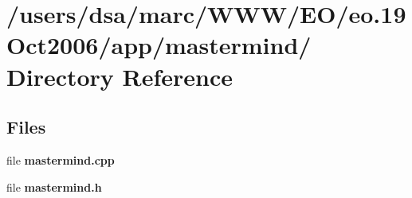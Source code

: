\section{/users/dsa/marc/WWW/EO/eo.19Oct2006/app/mastermind/ Directory Reference}
\label{dir_000027}
\subsection*{Files}
\begin{CompactItemize}
\item 
file {\bf mastermind.cpp}
\item 
file {\bf mastermind.h}
\end{CompactItemize}

